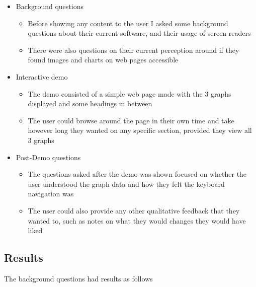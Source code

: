 \documentclass[ %
                    author={Aleena Baig},
                supervisor={Dr Simon Lock},
                    degree={BSc},
                     title={On Making Web Accessible Graphs},
                  subtitle={},
                      year={2019} ]{dissertation}
\begin{document}
\begin{itemize}
    \item Background questions
    \begin{itemize}
        \item Before showing any content to the user I asked some background questions about their current software, and their usage of screen-readers
        \item There were also questions on their current perception around if they found images and charts on web pages accessible
    \end{itemize}
    \item Interactive demo
    \begin{itemize}
        \item The demo consisted of a simple web page made with the 3 graphs displayed and some headings in between
        \item The user could browse around the page in their own time and take however long they wanted on any specific section, provided they view all 3 graphs
    \end{itemize}
    \item Post-Demo questions
    \begin{itemize}
        \item The questions asked after the demo was shown focused on whether the user understood the graph data and how they felt the keyboard navigation was
        \item The user could also provide any other qualitative feedback that they wanted to, such as notes on what they would changes they would have liked
    \end{itemize}
\end{itemize}

\subsection{Results}

The background questions had results as follows
\end{document}

